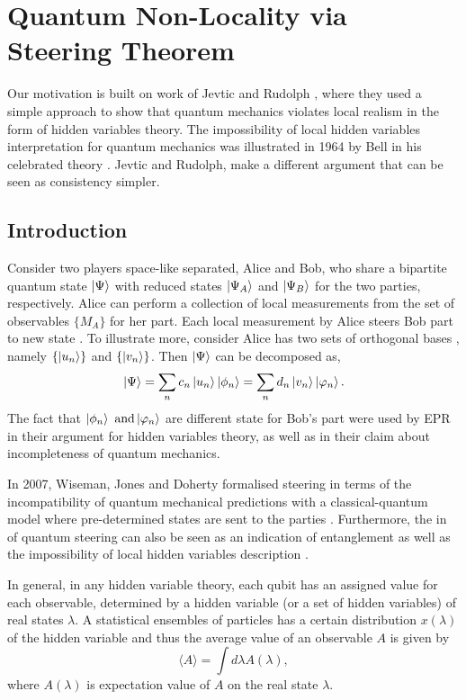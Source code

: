 \chapter{Quantum Non-Locality via Steering Theorem}
Our motivation is built on work of Jevtic and  Rudolph \citep*{Jevtic:2015:10.1364/JOSAB.32.000A50}, where they used a simple approach to show that  quantum mechanics violates local realism in the form of hidden variables theory. The impossibility of local hidden variables interpretation for quantum mechanics was illustrated in 1964 by Bell in his celebrated theory  \citep*{book:800289}. Jevtic and  Rudolph, make a different argument that can be seen as consistency simpler.

\section{Introduction}\hfill \break
Consider two players space-like separated, Alice and Bob, who share a bipartite quantum state  $\ket{\Psi}$ with reduced states $\ket{\Psi_A}$ and $\ket{\Psi_B}$ for the two parties, respectively. Alice can perform a collection of local measurements from the set of observables $\{M_A\}$ for her part. Each local measurement by Alice steers Bob part to new state \citep{book:474706}. To illustrate more, consider Alice has two sets of orthogonal bases , namely $\{\ket{u_n}\}$ and $\{\ket{v_n}\}$.  Then $\ket{\Psi}$ can be decomposed as,
\begin{equation}
\ket{\Psi}=\sum_n c_n  \ket{u_n}\ket{\phi_n}=\sum_n d_n\ket{v_n} \ket{\varphi_n}.
\end{equation}
The fact that $\ket{\phi_n} \text{ and} \ket{\varphi_n}$ are different state for Bob's part were used by EPR in their argument for hidden variables theory, as well as in their claim about incompleteness of quantum mechanics.

 In 2007, Wiseman, Jones and Doherty formalised steering in terms of the incompatibility of quantum mechanical predictions with a classical-quantum model where pre-determined states are sent to the parties \citep*{PhysRevA.76.052116}. Furthermore, the in of quantum steering can also be seen as an indication of entanglement as well as the impossibility of local hidden variables description \citep*{Jevtic:2015:10.1364/JOSAB.32.000A50}.


In general, in any hidden variable theory, each qubit has an assigned value for each observable, determined by a hidden variable (or a set of hidden variables) of real
states $\lambda$. A statistical ensembles of particles has a certain distribution $x(\lambda)$ of the hidden variable and thus the average value of an observable $A$ is given by
\begin{equation}
\langle A \rangle =\int d \lambda A(\lambda),
\end{equation}
where $A(\lambda)$ is expectation value of $A$ on the real state $\lambda$.


